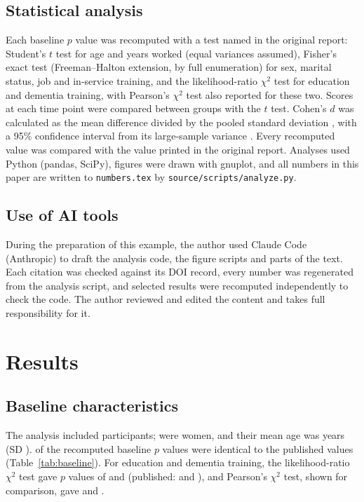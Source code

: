 \documentclass[pdflatex,sn-vancouver-num,referee,lineno]{sn-jnl}
\begin{document}
\subsection{Statistical analysis}
Each baseline $p$ value was recomputed with a test named in the original report: Student's $t$ test for age and years worked (equal variances assumed), Fisher's exact test (Freeman--Halton extension, by full enumeration) for sex, marital status, job and in-service training, and the likelihood-ratio $\chi^2$ test for education and dementia training, with Pearson's $\chi^2$ test also reported for these two. Scores at each time point were compared between groups with the $t$ test. Cohen's $d$ was calculated as the mean difference divided by the pooled standard deviation \cite{Cohen2013}, with a 95\% confidence interval from its large-sample variance \cite{HedgesOlkin1985}. Every recomputed value was compared with the value printed in the original report. \ExcludedSentence{} Analyses used Python (pandas, SciPy), figures were drawn with gnuplot, and all numbers in this paper are written to \texttt{numbers.tex} by \texttt{source/scripts/analyze.py}.

\subsection{Use of AI tools}
During the preparation of this example, the author used Claude Code (Anthropic) to draft the analysis code, the figure scripts and parts of the text. Each citation was checked against its DOI record, every number was regenerated from the analysis script, and selected results were recomputed independently to check the code. The author reviewed and edited the content and takes full responsibility for it.

\section{Results}
\subsection{Baseline characteristics}
The analysis included \NTotal{} participants; \NFemale{} were women, and their mean age was \AgeMean{} years (SD \AgeSD{}). \TOneMatch{} of the \TOneTotal{} recomputed baseline $p$ values were identical to the published values (Table~\ref{tab:baseline}). For education and dementia training, the likelihood-ratio $\chi^2$ test gave $p$ values of \EduLRP{} and \DemLRP{} (published: \EduPubP{} and \DemPubP{}), and Pearson's $\chi^2$ test, shown for comparison, gave \EduPearsonP{} and \DemPearsonP{}.
\end{document}
